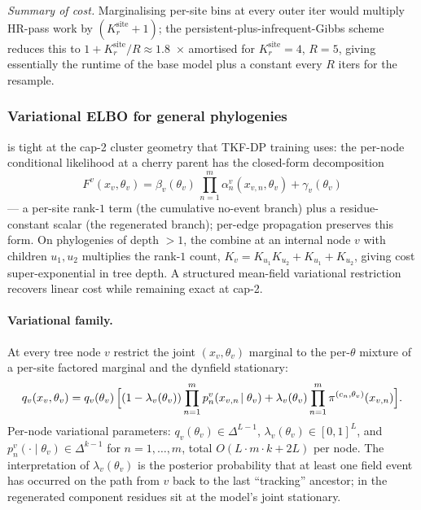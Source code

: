 \emph{Summary of cost.} Marginalising per-site bins at every outer
iter would multiply HR-pass work by $(K_r^{\mathrm{site}} + 1)$; the
persistent-plus-infrequent-Gibbs scheme reduces this to
$1 + K_r^{\mathrm{site}}/R \approx 1.8$~× amortised for
$K_r^{\mathrm{site}} = 4$, $R = 5$, giving essentially the runtime of
the base model plus a constant every $R$ iters for the resample.

\subsubsection{Variational ELBO for general phylogenies}
\label{sec:variational-suppl}

 is tight at the cap-2 cluster geometry that
TKF-DP training uses: the per-node conditional likelihood at a
cherry parent has the closed-form decomposition
\begin{equation}
  F^v(x_v,\theta_v) = \beta_v(\theta_v)\,\prod_{n=1}^{m}
                       \alpha_n^v(x_{v,n},\theta_v) + \gamma_v(\theta_v)
  \label{eq:rank1plusscalar}
\end{equation}
--- a per-site rank-$1$ term (the cumulative no-event branch) plus
a residue-constant scalar (the regenerated branch); per-edge
propagation preserves this form. On phylogenies of depth $>1$, the
combine at an internal node $v$ with children $u_1,u_2$ multiplies
the rank-$1$ count, $K_v = K_{u_1}K_{u_2} + K_{u_1} + K_{u_2}$,
giving cost super-exponential in tree depth. A structured
mean-field variational restriction recovers linear cost while
remaining exact at cap-2.

\paragraph{Variational family.} At every tree node $v$ restrict the
joint $(x_v,\theta_v)$ marginal to the per-$\theta$ mixture of a
per-site factored marginal and the dynfield stationary:
\begin{equation}
  q_v(x_v,\theta_v) = q_v(\theta_v)\,\Big[(1-\lambda_v(\theta_v))
                            \prod_{n=1}^{m} p_n^v(x_{v,n}\!\mid\theta_v)
                       + \lambda_v(\theta_v)
                            \prod_{n=1}^{m} \pi^{(c_n,\theta_v)}(x_{v,n})\Big].
  \label{eq:varform}
\end{equation}
Per-node variational parameters: $q_v(\theta_v)\in\Delta^{L-1}$,
$\lambda_v(\theta_v)\in[0,1]^L$, and $p_n^v(\cdot\!\mid\theta_v)\in
\Delta^{k-1}$ for $n=1,\dots,m$, total $O(L\cdot m\cdot k + 2L)$
per node. The interpretation of $\lambda_v(\theta_v)$ is the
posterior probability that at least one field event has occurred
on the path from $v$ back to the last ``tracking'' ancestor; in the
regenerated component residues sit at the model's joint stationary.

